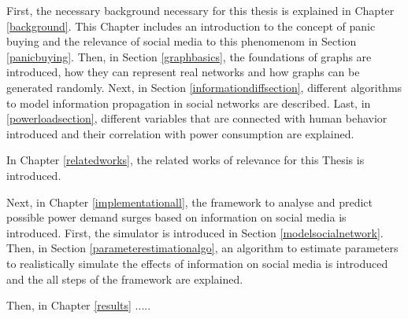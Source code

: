 First, the necessary background necessary for this thesis is explained
in Chapter \ref{background}. This Chapter includes an introduction
to the concept of panic buying and the relevance of social media 
to this phenomenom in Section \ref{panicbuying}. Then, in 
Section \ref{graphbasics}, the foundations of graphs are introduced,
how they can represent real networks and how graphs can be
generated randomly. Next, in Section \ref{informationdiffsection},
different algorithms to model information propagation in 
social networks are described. Last, in \ref{powerloadsection},
different variables that are connected with human behavior
introduced and their correlation with power consumption are 
explained.

In Chapter \ref{relatedworks}, the related works of relevance for 
this Thesis is introduced.

Next, in Chapter \ref{implementationall}, the framework to
analyse and predict possible power demand surges based on
information on social media is introduced.
First, the simulator is introduced in Section \ref{modelsocialnetwork}.
Then, in Section \ref{parameterestimationalgo}, 
an algorithm to estimate parameters to realistically simulate
the effects of information on social media is introduced and 
the all steps of the framework are explained.

Then, in Chapter \ref{results} .....